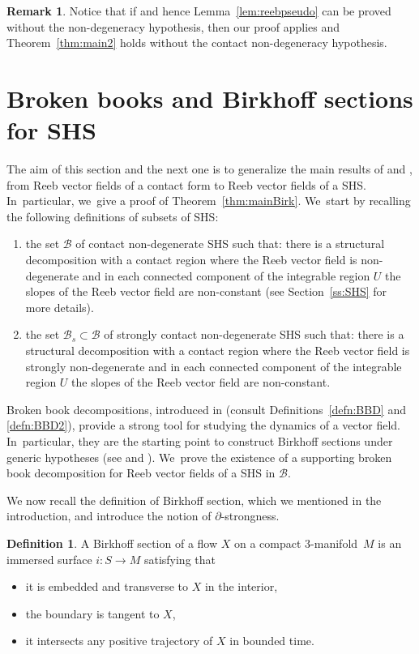 \documentclass[10pt]{amsart}
\newcommand{\threemanifold}{$3$\nobreakdash-mani\-fold\xspace}
\theoremstyle{definition}
\newtheorem{defi}[theorem]{Definition}
\newtheorem{Remark}[theorem]{Remark}
\begin{document}
\begin{Remark}\label{rem:degeneratecase}
Notice that if \cite[Th.\,1.2]{CDR} and hence Lemma~\ref{lem:reebpseudo} can be proved without the non-degeneracy hypothesis, then our proof applies and Theorem~\ref{thm:main2} holds without the contact non-degeneracy hypothesis.
\end{Remark}

\section{Broken books and Birkhoff sections for SHS}\label{s:SHSsections}

The aim of this section and the next one is to generalize the main results of \cite{CDR} and \cite{CDHR, CM}, from Reeb vector fields of a contact form to Reeb vector fields of a SHS. In~particular, we~give a proof of Theorem~\ref{thm:mainBirk}. We~start by recalling the following definitions of subsets of SHS:
\begin{enumerate}
\item the set $\mathcal{B}$ of contact non-degenerate SHS such that: there is a structural decomposition with a contact region where the Reeb vector field is non-degenerate and in each connected component of the integrable region $U$ the slopes of the Reeb vector field are non-constant (see Section~\ref{ss:SHS} for more details).
\item the set $\mathcal{B}_s\subset \mathcal{B}$ of strongly contact non-degenerate SHS such that: there is a structural decomposition with a contact region where the Reeb vector field is strongly non-degenerate and in each connected component of the integrable region $U$ the slopes of the Reeb vector field are non-constant.
\end{enumerate}

Broken book decompositions, introduced in \cite{CDR} (consult Definitions~\ref{defn:BBD} and \ref{defn:BBD2}), provide a strong tool for studying the dynamics of a vector field. In~particular, they are the starting point to construct Birkhoff sections under generic hypotheses (see \cite{CDHR} and \cite{CM}). We~prove the existence of a supporting broken book decomposition for Reeb vector fields of a SHS in $\mathcal{B}$.

We now recall the definition of Birkhoff section, which we mentioned in the introduction, and introduce the notion of $\partial$-strongness.

\begin{defi}
A Birkhoff section of a flow $X$ on a compact \threemanifold~$M$ is an immersed surface $i:S \to M$ satisfying that
\begin{itemize}
\item
it is embedded and transverse to $X$ in the interior,
\item
the boundary is tangent to $X$,
\item
it intersects any positive trajectory of $X$ in bounded time.
\end{itemize}
\end{defi}
\end{document}
